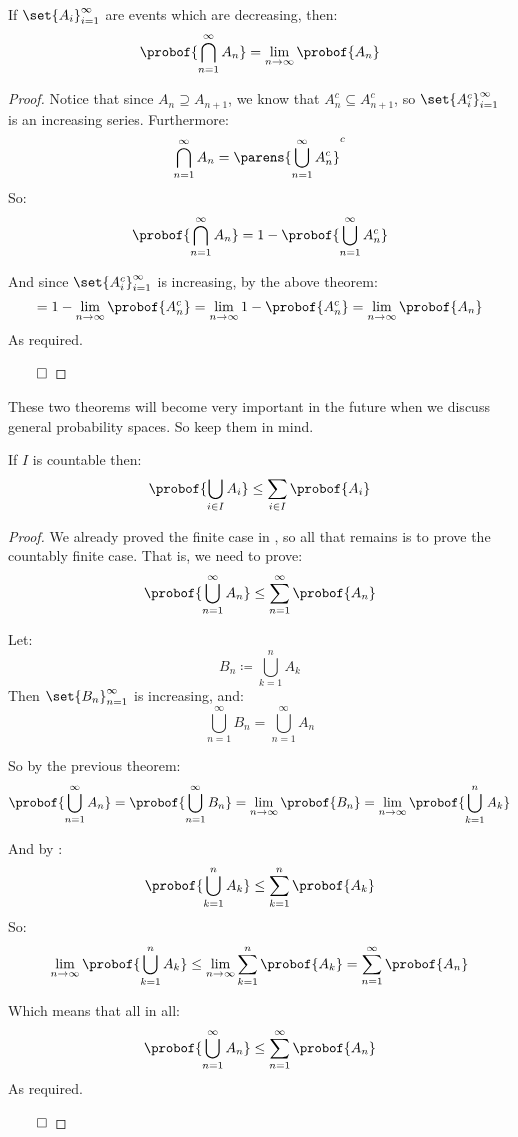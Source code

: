 \begin{coro*}[contProbCoro]

	If $\set{A_i}_{i=1}^\infty$ are events which are decreasing, then:
	\[ \probof{\bigcap_{n=1}^\infty A_n} = \lim_{n\to\infty}\probof{A_n} \]

\end{coro*}

\begin{proof}

	Notice that since $A_n\supseteq A_{n+1}$, we know that $A_n^c\subseteq A_{n+1}^c$, so $\set{A_i^c}_{i=1}^\infty$ is an
	increasing series.
	Furthermore:
	\[ \bigcap_{n=1}^\infty A_n = \parens{\bigcup_{n=1}^\infty A_n^c}^c \]
	So:
	\[ \probof{\bigcap_{n=1}^\infty A_n} = 1 - \probof{\bigcup_{n=1}^\infty A_n^c} \]

	And since $\set{A_i^c}_{i=1}^\infty$ is increasing, by the above theorem:
	\[ = 1 - \lim_{n\to\infty}\probof{A_n^c} = \lim_{n\to\infty} 1-\probof{A_n^c} = \lim_{n\to\infty}\probof{A_n} \]
	As required.

\hfill$\qed$

\end{proof}

\begin{note}

	These two theorems will become very important in the future when we discuss general probability spaces.
	So keep them in mind.

\end{note}

\newpage
\begin{thrm*}

	If $I$ is countable then:
	\[ \probof{\bigcup_{i\in I} A_i}\leq\sum_{i\in I}\probof{A_i} \]

\end{thrm*}

\begin{proof}

	We already proved the finite case in ,
	so all that remains is to prove the countably finite case.
	That is, we need to prove:
	\[ \probof{\bigcup_{n=1}^\infty A_n} \leq \sum_{n=1}^\infty\probof{A_n} \]

	Let:
	\[ B_n\coloneqq\bigcup_{k=1}^n A_k \]
	Then $\set{B_n}_{n=1}^\infty$ is increasing, and:
	\[ \bigcup_{n=1}^\infty B_n = \bigcup_{n=1}^\infty A_n \]

	So by the previous theorem:
	\[ \probof{\bigcup_{n=1}^\infty A_n} = \probof{\bigcup_{n=1}^\infty B_n} = \lim_{n\to\infty}\probof{B_n} =
	\lim_{n\to\infty}\probof{\bigcup_{k=1}^n A_k} \]

	And by :
	\[ \probof{\bigcup_{k=1}^n A_k}\leq\sum_{k=1}^n\probof{A_k} \]
	So:
	\[ \lim_{n\to\infty}\probof{\bigcup_{k=1}^n A_k}\leq\lim_{n\to\infty}\sum_{k=1}^n\probof{A_k} = \sum_{n=1}^\infty\probof{A_n} \]

	Which means that all in all:
	\[ \probof{\bigcup_{n=1}^\infty A_n} \leq \sum_{n=1}^\infty\probof{A_n} \]
	As required.

\hfill$\qed$

\end{proof}

